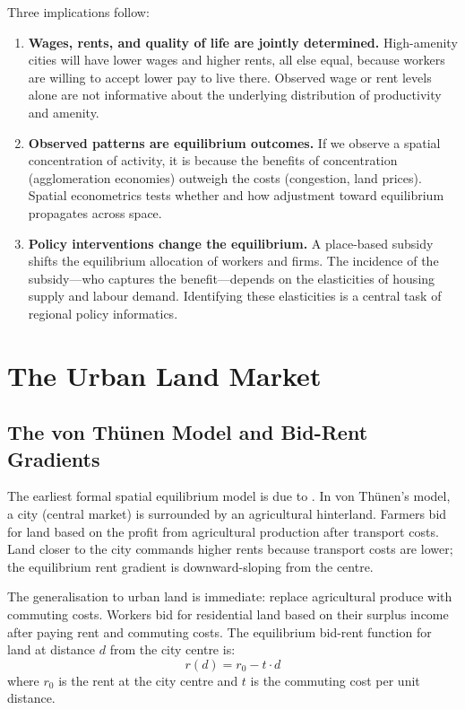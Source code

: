 Three implications follow:

\begin{enumerate}
  \item \textbf{Wages, rents, and quality of life are jointly determined.}
    High-amenity cities will have lower wages and higher rents, all else
    equal, because workers are willing to accept lower pay to live there.
    Observed wage or rent levels alone are not informative about the
    underlying distribution of productivity and amenity.

  \item \textbf{Observed patterns are equilibrium outcomes.} If we observe
    a spatial concentration of activity, it is because the benefits of
    concentration (agglomeration economies) outweigh the costs (congestion,
    land prices). Spatial econometrics tests whether and how adjustment
    toward equilibrium propagates across space.

  \item \textbf{Policy interventions change the equilibrium.} A place-based
    subsidy shifts the equilibrium allocation of workers and firms. The
    incidence of the subsidy---who captures the benefit---depends on the
    elasticities of housing supply and labour demand. Identifying these
    elasticities is a central task of regional policy informatics.
\end{enumerate}



\section{The Urban Land Market}
\label{sec_LandMarket}

\subsection{The von Thünen Model and Bid-Rent Gradients}

The earliest formal spatial equilibrium model is due to \citet{Thunen1826}.
In von Thünen's model, a city (central market) is surrounded by an
agricultural hinterland. Farmers bid for land based on the profit from
agricultural production after transport costs. Land closer to the city
commands higher rents because transport costs are lower; the equilibrium
rent gradient is downward-sloping from the centre.

The generalisation to urban land is immediate: replace agricultural produce
with commuting costs. Workers bid for residential land based on their surplus
income after paying rent and commuting costs. The equilibrium bid-rent
function for land at distance $d$ from the city centre is:
\begin{equation}
  r(d) = r_0 - t \cdot d
\end{equation}
where $r_0$ is the rent at the city centre and $t$ is the commuting cost per
unit distance.

